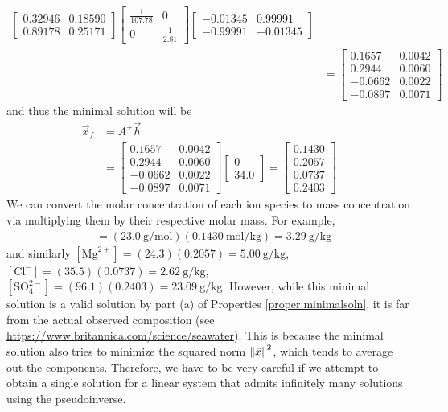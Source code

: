 \begin{solution}
\begin{align*}
\begin{bmatrix}
0.32946 & 0.18590 \\
0.89178 & 0.25171
\end{bmatrix}
\begin{bmatrix}
\frac{1}{107.78} & 0 \\
0 & \frac{1}{2.81}
\end{bmatrix}
\begin{bmatrix}
-0.01345 & 0.99991 \\
-0.99991 & -0.01345
\end{bmatrix} \\
&=
\begin{bmatrix}
0.1657 & 0.0042 \\
0.2944 & 0.0060 \\
-0.0662 & 0.0022 \\
-0.0897 & 0.0071 
\end{bmatrix}
\end{align*}
and thus the minimal solution will be
\begin{align*}
\vec{x}_f &= A^+\vec{h} \\
&= 
\begin{bmatrix}
0.1657 & 0.0042 \\
0.2944 & 0.0060 \\
-0.0662 & 0.0022 \\
-0.0897 & 0.0071 
\end{bmatrix}
\begin{bmatrix}
0 \\
34.0
\end{bmatrix}
=
\begin{bmatrix}
0.1430 \\
0.2057 \\
0.0737 \\
0.2403
\end{bmatrix}
\end{align*}
We can convert the molar concentration of each ion species to mass concentration via multiplying them by their respective molar mass. For example,
\begin{align*}
[\text{Na}^+] &= (\SI{23.0}{\g \per \mol})(\SI{0.1430}{\mol \per \kg}) = \SI{3.29}{\g \per \kg}
\end{align*}
and similarly $[\text{Mg}^{2+}] = (24.3)(0.2057) = \SI{5.00}{\g \per \kg}$, $[\text{Cl}^{-}] = (35.5)(0.0737) \allowbreak = \SI{2.62}{\g \per \kg}$, $[\text{SO}_4^{2-}] = (96.1)(0.2403) = \SI{23.09}{\g \per \kg}$. However, while this minimal solution is a valid solution by part (a) of Properties \ref{proper:minimalsoln}, it is far from the actual observed composition (see \href{https://www.britannica.com/science/seawater}{https://www.britannica.com/science/seawater}). This is because the minimal solution also tries to minimize the squared norm $\norm{\vec{x}}^2$, which tends to average out the components. Therefore, we have to be very careful if we attempt to obtain a single solution for a linear system that admits infinitely many solutions using the pseudoinverse.
\end{solution}

